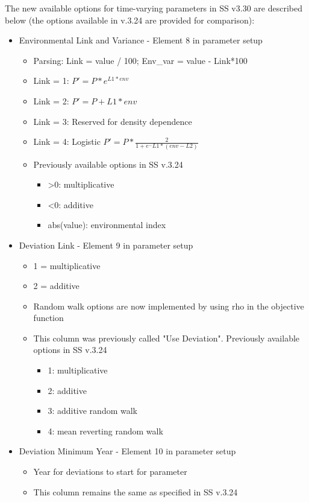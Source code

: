 The new available options for time-varying parameters in SS v3.30 are described below (the options available in v.3.24 are provided for comparison):
\begin{itemize}
	\item Environmental Link and  Variance - Element 8 in parameter setup
		\begin{itemize}
			\item Parsing: Link = value / 100; Env\_var = value - Link*100
			\item Link = 1: $P'=P*e^{L1*env}$
			\item Link = 2: $P'=P+L1*env$
			\item Link = 3: Reserved for density dependence
			\item Link = 4: Logistic $P'=P*\frac{2}{1+e^-L1*(env-L2)}$
			\item Previously available options in SS v.3.24
			\begin{itemize}
				\item >0: multiplicative
				\item <0: additive
				\item abs(value): environmental index
			\end{itemize}
		\end{itemize}
	\item Deviation Link - Element 9 in parameter setup
	\begin{itemize}
		\item 1 = multiplicative
		\item 2 = additive
		\item Random walk options are now implemented by using rho in the objective function
		\item This column was previously called "Use Deviation". Previously available options in SS v.3.24
		\begin{itemize}
			\item 1: multiplicative
			\item 2: additive
			\item 3: additive random walk
			\item 4: mean reverting random walk
		\end{itemize}
	\end{itemize}
	\item Deviation  Minimum Year - Element 10 in parameter setup
		\begin{itemize}
			\item Year for deviations to start for parameter
			\item This column remains the same as specified in SS v.3.24

\end{itemize}
\end{itemize}
